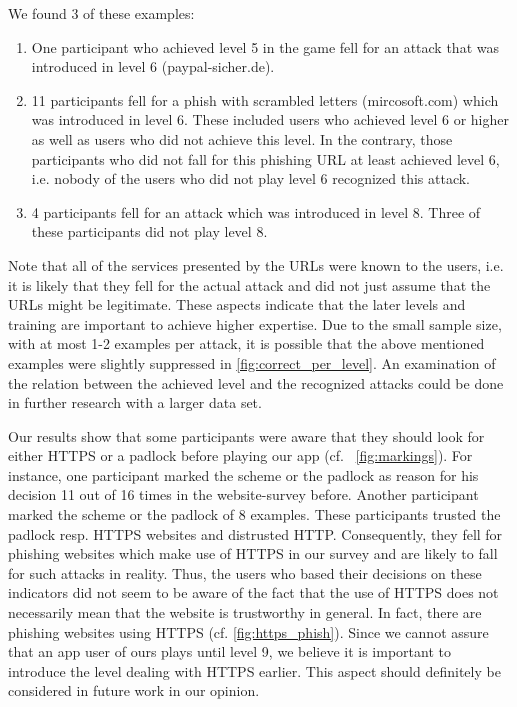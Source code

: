 \begin{description}[leftmargin=0cm]
We found 3 of these examples:
\begin{enumerate}
\item One participant who achieved level 5 in the game fell for an attack that was introduced in level 6 (paypal-sicher.de).
\item 11 participants fell for a phish with scrambled letters (mircosoft.com) which was introduced in level 6. These included users who achieved level 6 or higher as well as users who did not achieve this level. In the contrary, those participants who did not fall for this phishing URL at least achieved level 6, i.e. nobody of the users who did not play level 6 recognized this attack. 
\item 4 participants fell for an attack which was introduced in level 8. Three of these participants did not play level 8.
\end{enumerate}
	Note that all of the services presented by the URLs were known to the users, i.e. it is likely that they fell for the actual attack and did not just assume that the URLs might be legitimate.
	These aspects indicate that the later levels and training are important to achieve higher expertise.
	Due to the small sample size, with at most 1-2 examples per attack, it is possible that the above mentioned examples were slightly suppressed in \autoref{fig:correct_per_level}.
	An examination of the relation between the achieved level and the recognized attacks could be done in further research with a larger data set.
	\item[HTTPS and Padlock:] Our results show that some participants were aware that they should look for either HTTPS or a padlock before playing our app (cf. ~\autoref{fig:markings}).
	For instance, one participant marked the scheme or the padlock as reason for his decision 11 out of 16 times in the website-survey before. 
	Another participant marked the scheme or the padlock of 8 examples.
	These participants trusted the padlock resp. HTTPS websites and distrusted HTTP.
	Consequently, they fell for phishing websites which make use of HTTPS in our survey and are likely to fall for such attacks in reality.
	Thus, the users who based their decisions on these indicators did not seem to be aware of the fact that the use of HTTPS does not necessarily mean that the website is trustworthy in general.
	In fact, there are phishing websites using HTTPS (cf. \autoref{fig:https_phish}). 
	Since we cannot assure that an app user of ours plays until level 9, we believe it is important to introduce the level dealing with HTTPS earlier.
	This aspect should definitely be considered in future work in our opinion.

\end{description}
